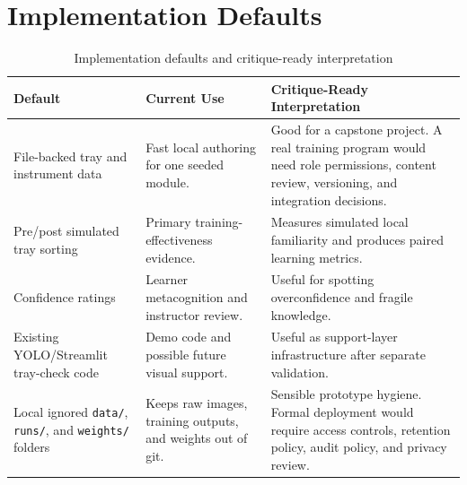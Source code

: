 \documentclass[10pt,a4paper]{article}
\begin{document}
\section{Implementation Defaults}
\label{sec:appendix-b-implementation-defaults}

\begin{table}[H]
\centering
\caption{Implementation defaults and critique-ready interpretation}
\label{tab:implementation-defaults-and-critique-ready-interpretation}
\small\renewcommand{\arraystretch}{1.2}\setlength{\tabcolsep}{4pt}
\begin{tabularx}{\textwidth}{|>{\raggedright\arraybackslash}X|>{\raggedright\arraybackslash}X|>{\raggedright\arraybackslash}X|}
\hline
Default & Current Use & Critique-Ready Interpretation \\
\hline
File-backed tray and instrument data & Fast local authoring for one seeded module. & Good for a capstone project. A real training program would need role permissions, content review, versioning, and integration decisions. \\
\hline
Pre/post simulated tray sorting & Primary training-effectiveness evidence. & Measures simulated local familiarity and produces paired learning metrics. \\
\hline
Confidence ratings & Learner metacognition and instructor review. & Useful for spotting overconfidence and fragile knowledge. \\
\hline
Existing YOLO/Streamlit tray-check code & Demo code and possible future visual support. & Useful as support-layer infrastructure after separate validation. \\
\hline
Local ignored \texttt{data/}, \texttt{runs/}, and \texttt{weights/} folders & Keeps raw images, training outputs, and weights out of git. & Sensible prototype hygiene. Formal deployment would require access controls, retention policy, audit policy, and privacy review. \\
\hline
\end{tabularx}
\end{table}
\end{document}
